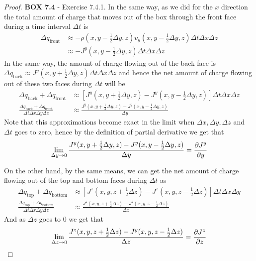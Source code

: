 \documentclass[11pt]{article}
\theoremstyle{definition}
\begin{document}
\begin{proof}{\textbf{BOX 7.4} - Exercise 7.4.1.}
    In the same way, as we did for the $x$ direction the total amount of 
    charge that moves out of the box through the front face during a 
    time interval $\Delta t$ is
    \begin{align*}
        \Delta q_{\text{front}} &\approx
        - \rho(x, y - \frac{1}{2}\Delta y, z)
        v_y(x, y - \frac{1}{2}\Delta y, z)\Delta t \Delta x \Delta z\\
        &\approx - J^y(x, y - \frac{1}{2}\Delta y, z)\Delta t \Delta x \Delta z
    \end{align*}
    In the same way, the amount of charge flowing out of the back face
    is $ \Delta q_{\text{back}}
    \approx J^y(x, y + \frac{1}{2}\Delta y, z)\Delta t \Delta x \Delta z$
    and hence the net amount of charge flowing out of these two faces during
    $\Delta t$ will be
    \begin{align*}
        \Delta q_{\text{back}} + \Delta q_{\text{front}}
        &\approx [J^y(x, y + \frac{1}{2}\Delta y, z)
        - J^y(x, y - \frac{1}{2}\Delta y, z)]\Delta t \Delta x \Delta z\\
        \frac{\Delta q_{\text{back}} + \Delta q_{\text{front}}
        }{\Delta t\Delta x \Delta y\Delta z}
        &\approx \frac{J^y(x, y + \frac{1}{2}\Delta y, z) 
        - J^y(x, y - \frac{1}{2}\Delta y, z)}{\Delta y}
    \end{align*}
    Note that this approximations become exact in the limit when
    $\Delta x, \Delta y, \Delta z$ and $\Delta t$ goes to zero, hence by the 
    definition of partial derivative we get that
    \begin{align*}
    \lim_{\Delta y \to 0} \frac{J^y(x, y + \frac{1}{2}\Delta y, z) 
        - J^y(x, y - \frac{1}{2}\Delta y, z)}{\Delta y} 
    = \partialderivative{J^y}{y}
    \end{align*}

    On the other hand, by the same means, we can get the net amount of charge
    flowing out of the top and bottom faces during $\Delta t$ as
    \begin{align*}
        \Delta q_{\text{top}} + \Delta q_{\text{bottom}}
        &\approx [J^z(x, y, z + \frac{1}{2}\Delta z)
        - J^z(x, y, z - \frac{1}{2}\Delta z)]\Delta t \Delta x \Delta y\\
        \frac{\Delta q_{\text{top}} + \Delta q_{\text{bottom}}
        }{\Delta t\Delta x \Delta y\Delta z}
        &\approx \frac{J^z(x, y, z + \frac{1}{2}\Delta z) 
        - J^z(x, y, z - \frac{1}{2}\Delta z)}{\Delta z}
    \end{align*}
    And as $\Delta z$ goes to 0 we get that
    \begin{align*}
        \lim_{\Delta z \to 0} \frac{J^z(x, y, z + \frac{1}{2}\Delta z) 
            - J^y(x, y, z - \frac{1}{2}\Delta z)}{\Delta z} 
        = \partialderivative{J^z}{z}
        \end{align*}
\end{proof}
\end{document}
